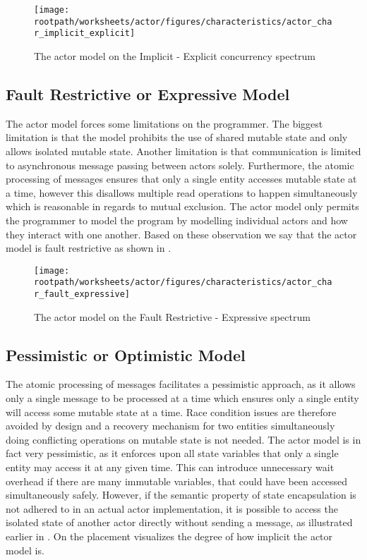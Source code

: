 \begin{figure}[htbp]
\centering
 \texttt{[image: \\rootpath/worksheets/actor/figures/characteristics/actor\_char\_implicit\_explicit]} 
 \caption{The actor model on the Implicit - Explicit concurrency spectrum}
\label{fig:actor_implicit_explicit}
\end{figure}
\subsection{Fault Restrictive or Expressive Model}\label{sec_actor_fault_express}
The actor model forces some limitations on the programmer. The biggest limitation is that the model prohibits the use of shared mutable state and only allows isolated mutable state. Another limitation is that communication is limited to asynchronous message passing between actors solely. Furthermore, the atomic processing of messages ensures that only a single entity accesses mutable state at a time, however this disallows multiple read operations to happen simultaneously which is reasonable in regards to mutual exclusion. The actor model only permits the programmer to model the program by modelling individual actors and how they interact with one another. Based on these observation we say that the actor model is fault restrictive as shown in .

\begin{figure}[htbp]
\centering
 \texttt{[image: \\rootpath/worksheets/actor/figures/characteristics/actor\_char\_fault\_expressive]} 
 \caption{The actor model on the Fault Restrictive - Expressive spectrum}
\label{fig:actor_fault_expressive}
\end{figure}

\subsection{Pessimistic or Optimistic Model}
The atomic processing of messages facilitates a pessimistic approach, as it allows only a single message to be processed at a time which ensures only a single entity will access some mutable state at a time. Race condition issues are therefore avoided by design and a recovery mechanism for two entities simultaneously doing conflicting operations on mutable state is not needed. The actor model is in fact very pessimistic, as it enforces upon all state variables that only a single entity may access it at any given time. This can introduce unnecessary wait overhead if there are many immutable variables, that could have been accessed simultaneously safely. However, if the semantic property of state encapsulation is not adhered to in an actual actor implementation, it is possible to access the isolated state of another actor directly without sending a message, as illustrated earlier in . On  the placement visualizes the degree of how implicit the actor model is.

